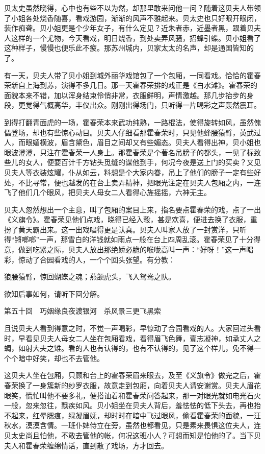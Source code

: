 \documentclass[12pt,UTF8]{ctexbook}
\begin{document}
{{{贝太史虽然晓得，心中也有些不以为然，却那里敢来问他一问？随着这贝夫人带领了小姐各处烧香随喜，看戏游园，渐渐的风声不雅起来。贝太史也只好眼开眼闭，装作痴聋。贝小姐更是个少年女子，有什么定见？近朱者赤，近墨者黑，跟着贝夫人这样的一个尤物，今天看戏，明日烧香，到处卖弄风骚，招蜂引蝶。贝小姐看了这种样子，慢慢也便乐此不疲。那苏州城内，贝家太太的名声，却是通国皆知的了。

有一天，贝夫人带了贝小姐到城外丽华戏馆包了一个包厢，一同看戏。恰恰的霍春荣新自上海到苏，演得不多几日。那一天霍春荣排的戏正是《白水滩》。霍春荣的面貌本来不错，加以浑身结束伶俏非常，衣服鲜明，声情激越。那几步抬步的身段，更觉得气概高华，丰仪出众。刚刚出得场门，只听得一片喝彩之声轰然震耳。

到得打翻青面虎的一场，霍春荣本来武功纯熟，一路棍法，使得旋转如风，虽然傀儡登场，却也有些惊心动目。贝夫人仔细看那霍春荣时，只见他蜂腰猿臂，英武过人，而眼媚横波，眉含黛色，眉目之间却又有些媚态。贝夫人看得出神，贝小姐也眼波澄澄，只注在霍春荣一人身上。那霍春荣是个著名吊膀子的都头，一见了标致些儿的女人，便要百计千方钻头觅缝的谋他到手，何况今夜是送上门的买卖？又见贝夫人等衣装炫耀，仆从如云，料想是个大家内眷，吊上了他们的膀子一定有些好处，不比寻常，便也越发的在台上卖弄精神，把眼光注定在贝夫人包厢之内，一连飞了他们几个眼风，把贝夫人母女二人看得心旌摇摇，六神无主。

贝夫人忽然想出一个主意，叫了包厢的案目上来，指名要点霍春荣的戏，点了一出《义旗令》。霍春荣见他们点戏，晓得已经入彀，甚是欢喜，便进去换了衣服，重扮了黄天霸出来。这一出戏唱得更是认真。贝夫人叫家人放了一封赏洋，只听得“锵啷啷”一声，那雪白的洋钱就如雨点一般在台上四周乱滚。霍春荣见了十分得意，做到吃紧之际，贝夫人放出那绝娇必脆的喉咙高叫一声：“好呀！”这一声喝彩，惊动了合园看戏的人，一个个回头张望。有分教：

狼腰猿臂，惊回蝴蝶之魂；燕颔虎头，飞入鸳鸯之队。

欲知后事如何，请听下回分解。





第五十回　巧姻缘良夜渡银河　杀风景三更飞黑索





且说贝夫人看到得意之时，不觉一声喝彩，早惊动了合园看戏的人。大家回过头看时，早看见贝夫人母女二人坐在包厢看戏，看得眉飞色舞，壹志凝神，如承丈人之蜩，如射大夫之雉。看的人也有认得的，也有不认得的，见了这个样儿，免不得一个个暗中好笑，却也不去管他。

这贝夫人坐在包厢，只顾和台上的霍春荣眉来眼去，及至《义旗令》做完之后，霍春荣换了一身簇新的纱罗衣服，故意走到包厢，向着贝夫人请安谢赏。贝夫人眉花眼笑，慌忙叫他不要多礼，便搭讪着和霍春荣问答起来，那一对眼光就如电光石火一般，忽来忽往，飘疾如风。贝小姐坐在贝夫人背后，羞怯怯的低下头去，再也抬不起来，红晕腮痕，绿凝眉妩，却时时在暗中飞过眼风，偷看霍春荣的面貌，一汪秋水，漠漠含情。一班仆婢侍立在旁，虽然也都看见，只是素来畏惧这位夫人，连贝太史尚且怕他，不敢去管他的帐，何况这班小人？可想而知是怕他的了。当下贝夫人和霍春荣缠绵情话，直到散了戏场，方才回去。

}}}
\end{document}
